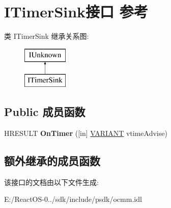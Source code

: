 \hypertarget{interface_i_timer_sink}{}\section{I\+Timer\+Sink接口 参考}
\label{interface_i_timer_sink}
类 I\+Timer\+Sink 继承关系图\+:\begin{figure}[H]
\begin{center}
\leavevmode
\includegraphics[height=2.000000cm]{interface_i_timer_sink}
\end{center}
\end{figure}
\subsection*{Public 成员函数}
\begin{DoxyCompactItemize}
\item 
\mbox{\label{interface_i_timer_sink_a00746bf4036cad51a351d49c4d7b6f1f}} 
H\+R\+E\+S\+U\+LT {\bfseries On\+Timer} (\mbox{[}in\mbox{]} \hyperlink{structtag_v_a_r_i_a_n_t}{V\+A\+R\+I\+A\+NT} vtime\+Advise)
\end{DoxyCompactItemize}
\subsection*{额外继承的成员函数}


该接口的文档由以下文件生成\+:\begin{DoxyCompactItemize}
\item 
E\+:/\+React\+O\+S-\/0../sdk/include/psdk/ocmm.\+idl\end{DoxyCompactItemize}
